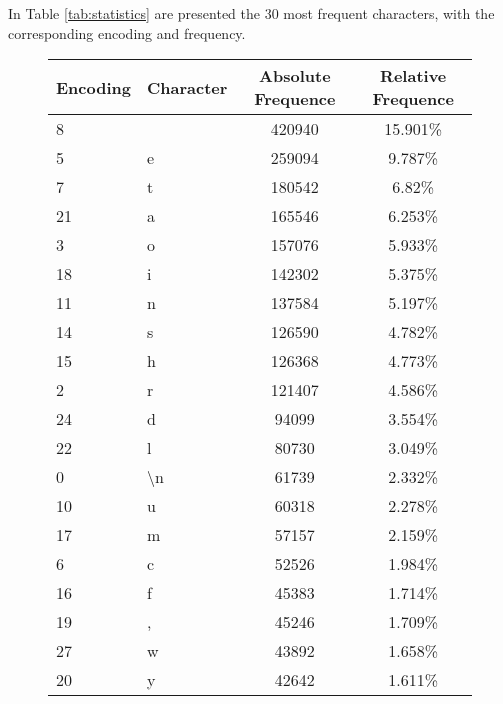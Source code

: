 \documentclass[a4paper,12pt]{article} %
\begin{document}
	In Table \ref{tab:statistics} are presented the $30$ most frequent 
	characters, with the corresponding encoding and frequency.
	
	\begin{figure}[H]
	\centering
	\begin{tabular}{llcc}
		\toprule
		Encoding & Character &  Absolute Frequence & Relative Frequence \\
		\midrule
		8        &           &              420940 &            15.901\% \\
		5        &         e &              259094 &             9.787\% \\
		7        &         t &              180542 &              6.82\% \\
		21       &         a &              165546 &             6.253\% \\
		3        &         o &              157076 &             5.933\% \\
		18       &         i &              142302 &             5.375\% \\
		11       &         n &              137584 &             5.197\% \\
		14       &         s &              126590 &             4.782\% \\
		15       &         h &              126368 &             4.773\% \\
		2        &         r &              121407 &             4.586\% \\
		24       &         d &               94099 &             3.554\% \\
		22       &         l &               80730 &             3.049\% \\
		0        &        \textbackslash n &               61739 &             
		2.332\% \\
		10       &         u &               60318 &             2.278\% \\
		17       &         m &               57157 &             2.159\% \\
		6        &         c &               52526 &             1.984\% \\
		16       &         f &               45383 &             1.714\% \\
		19       &         , &               45246 &             1.709\% \\
		27       &         w &               43892 &             1.658\% \\
		20       &         y &               42642 &             1.611\% \\

\end{tabular}
\end{figure}
\end{document}
